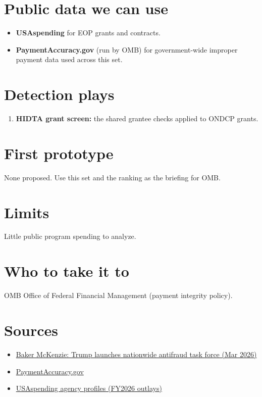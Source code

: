 \documentclass[letterpaper,11pt]{article}
\providecommand{\tightlist}{\setlength{\itemsep}{0pt}\setlength{\parskip}{0pt}}
\begin{document}
\hypertarget{public-data-we-can-use}{%
\section{Public data we can use}\label{public-data-we-can-use}}

\begin{itemize}
\tightlist
\item
  \textbf{USAspending} for EOP grants and contracts.
\item
  \textbf{PaymentAccuracy.gov} (run by OMB) for government-wide improper
  payment data used across this set.
\end{itemize}

\hypertarget{detection-plays}{%
\section{Detection plays}\label{detection-plays}}

\begin{enumerate}
\def\labelenumi{\arabic{enumi}.}
\tightlist
\item
  \textbf{HIDTA grant screen:} the shared grantee checks applied to
  ONDCP grants.
\end{enumerate}

\hypertarget{first-prototype}{%
\section{First prototype}\label{first-prototype}}

None proposed. Use this set and the ranking as the briefing for OMB.

\hypertarget{limits}{%
\section{Limits}\label{limits}}

Little public program spending to analyze.

\hypertarget{who-to-take-it-to}{%
\section{Who to take it to}\label{who-to-take-it-to}}

OMB Office of Federal Financial Management (payment integrity policy).

\hypertarget{sources}{%
\section{Sources}\label{sources}}

\begin{itemize}
\tightlist
\item
  \href{https://www.bakermckenzie.com/en/insight/publications/2026/03/united-states-trump-launches-nationwide-antifraud-task-force}{Baker
  McKenzie: Trump launches nationwide antifraud task force (Mar 2026)}
\item
  \href{https://paymentaccuracy.gov/}{PaymentAccuracy.gov}
\item
  \href{https://www.usaspending.gov/agency}{USAspending agency profiles
  (FY2026 outlays)}
\end{itemize}
\end{document}
